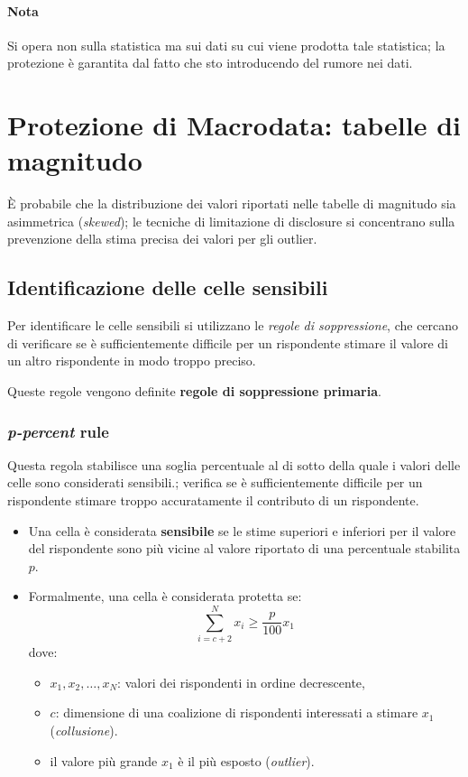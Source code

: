 \documentclass{report}
\begin{document}
\subsubsection{Nota}
Si opera non sulla statistica ma sui dati su cui viene prodotta tale statistica; la 
protezione è garantita dal fatto che sto introducendo del rumore nei dati.

\chapter{Protezione di Macrodata: tabelle di magnitudo}
È probabile che la distribuzione dei valori riportati nelle tabelle di magnitudo sia
asimmetrica (\textit{skewed}); le tecniche di limitazione di disclosure si concentrano 
sulla prevenzione della stima precisa dei valori per gli outlier.

\section{Identificazione delle celle sensibili}
Per identificare le celle sensibili si utilizzano le \textit{regole di soppressione},
che cercano di verificare
se è sufficientemente difficile per un rispondente stimare il valore di un altro 
rispondente in modo troppo preciso.

Queste regole vengono definite \textbf{regole di soppressione primaria}.

\subsection{\textit{p-percent} rule}
Questa regola stabilisce una soglia percentuale al di sotto della quale i valori 
delle celle sono considerati sensibili.; verifica se è sufficientemente difficile per 
un rispondente stimare troppo accuratamente il contributo di un rispondente.

\begin{itemize}
    \item Una cella è considerata \textbf{sensibile} se le stime superiori e inferiori per 
    il valore del rispondente sono più vicine al valore riportato di una percentuale 
    stabilita $p$.
    \item Formalmente, una cella è considerata protetta se:
    \[
    \sum_{i=c+2}^{N} x_i \geq \frac{p}{100} x_1
    \]
    dove:
    \begin{itemize}
        \item \( x_1, x_2, \ldots, x_N \): valori dei rispondenti in ordine decrescente,
        \item \( c \): dimensione di una coalizione di rispondenti interessati a stimare \( x_1 \) (\textit{collusione}).
        \item il valore più grande \( x_1 \) è il più esposto (\textit{outlier}).
    \end{itemize}
\end{itemize}
\end{document}
